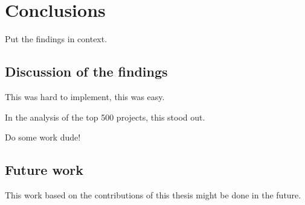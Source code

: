 
\chapter{Conclusions}\label{ch:conclusions}

Put the findings in context.



\section{Discussion of the findings}\label{sec:discussion}

This was hard to implement, this was easy.

In the analysis of the top 500 projects, this stood out.

Do some work dude!



\section{Future work}\label{sec:future-work}

This work based on the contributions of this thesis might be done in the future.